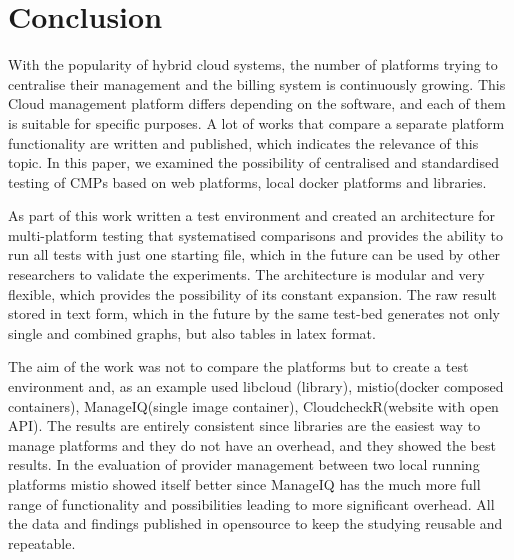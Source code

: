 \section{Conclusion}
With the popularity of hybrid cloud systems, the number of platforms trying to centralise their management and the billing system is continuously growing. This Cloud management platform differs depending on the software, and each of them is suitable for specific purposes. A lot of works that compare a separate platform functionality are written and published, which indicates the relevance of this topic. In this paper, we examined the possibility of centralised and standardised testing of CMPs based on web platforms, local docker platforms and libraries.

As part of this work written a test environment and created an architecture for multi-platform testing that systematised comparisons and provides the ability to run all tests with just one starting file, which in the future can be used by other researchers to validate the experiments. The architecture is modular and very flexible, which provides the possibility of its constant expansion. The raw result stored in text form, which in the future by the same test-bed generates not only single and combined graphs, but also tables in latex format.

The aim of the work was not to compare the platforms but to create a test environment and, as an example used libcloud (library), mistio(docker composed containers), ManageIQ(single image container), CloudcheckR(website with open API). The results are entirely consistent since libraries are the easiest way to manage platforms and they do not have an overhead, and they showed the best results. In the evaluation of provider management between two local running platforms mistio showed itself better since ManageIQ has the much more full range of functionality and possibilities leading to more significant overhead.
All the data and findings published in opensource to keep the studying reusable and repeatable.
